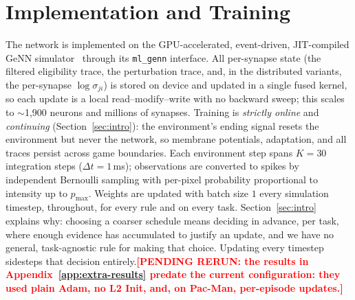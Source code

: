 \documentclass[10pt,twocolumn]{article}
\newcommand{\pending}[1]{\textcolor{red}{\bfseries[PENDING RERUN#1]}}
\begin{document}
\section{Implementation and Training}
\label{app:impl}
The network is implemented on the GPU-accelerated, event-driven, JIT-compiled
GeNN simulator~\citep{Yavuz2016GeNN} through its \texttt{ml\_genn} interface. All
per-synapse state (the filtered eligibility trace, the perturbation trace, and,
in the distributed variants, the per-synapse $\log\sigma_{ji}$) is stored on
device and updated in a single fused kernel, so each update is a local
read--modify--write with no backward sweep; this scales to $\sim$1{,}900 neurons
and millions of synapses. Training is \emph{strictly online} and
\emph{continuing} (Section~\ref{sec:intro}): the environment's ending signal
resets the environment but never the network, so membrane potentials,
adaptation, and all traces persist across game boundaries. Each environment step
spans $K=30$ integration steps ($\Delta t = 1$\,ms); observations are converted
to spikes by independent Bernoulli sampling with per-pixel probability
proportional to intensity up to $p_{\max}$. Weights are updated with batch size
$1$ every simulation timestep, throughout, for every rule and on every task.
Section~\ref{sec:intro} explains why: choosing a coarser schedule means
deciding in advance, per task, where enough evidence has accumulated to
justify an update, and we have no general, task-agnostic rule for making that
choice. Updating every timestep sidesteps that decision
entirely.\pending{: the results in Appendix~\ref{app:extra-results} predate
the current configuration: they used plain Adam, no L2 Init, and, on Pac-Man,
per-episode updates.}
\end{document}
